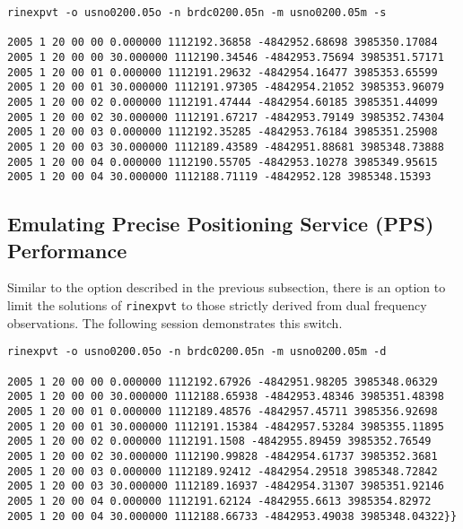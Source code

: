 \small
\begin{singlespace}
\begin{verbatim}
rinexpvt -o usno0200.05o -n brdc0200.05n -m usno0200.05m -s

2005 1 20 00 00 0.000000 1112192.36858 -4842952.68698 3985350.17084
2005 1 20 00 00 30.000000 1112190.34546 -4842953.75694 3985351.57171
2005 1 20 00 01 0.000000 1112191.29632 -4842954.16477 3985353.65599
2005 1 20 00 01 30.000000 1112191.97305 -4842954.21052 3985353.96079
2005 1 20 00 02 0.000000 1112191.47444 -4842954.60185 3985351.44099
2005 1 20 00 02 30.000000 1112191.67217 -4842953.79149 3985352.74304
2005 1 20 00 03 0.000000 1112192.35285 -4842953.76184 3985351.25908
2005 1 20 00 03 30.000000 1112189.43589 -4842951.88681 3985348.73888
2005 1 20 00 04 0.000000 1112190.55705 -4842953.10278 3985349.95615
2005 1 20 00 04 30.000000 1112188.71119 -4842952.128 3985348.15393
\end{verbatim}
\end{singlespace}
\normalsize


\subsection{Emulating Precise Positioning Service (PPS) Performance}

Similar to the option described in the previous subsection, there is an option
to limit the solutions of \texttt{rinexpvt} to those strictly derived from
dual frequency observations. The following session demonstrates this switch.

\small
\begin{singlespace}
\begin{verbatim}
rinexpvt -o usno0200.05o -n brdc0200.05n -m usno0200.05m -d

2005 1 20 00 00 0.000000 1112192.67926 -4842951.98205 3985348.06329
2005 1 20 00 00 30.000000 1112188.65938 -4842953.48346 3985351.48398
2005 1 20 00 01 0.000000 1112189.48576 -4842957.45711 3985356.92698
2005 1 20 00 01 30.000000 1112191.15384 -4842957.53284 3985355.11895
2005 1 20 00 02 0.000000 1112191.1508 -4842955.89459 3985352.76549
2005 1 20 00 02 30.000000 1112190.99828 -4842954.61737 3985352.3681
2005 1 20 00 03 0.000000 1112189.92412 -4842954.29518 3985348.72842
2005 1 20 00 03 30.000000 1112189.16937 -4842954.31307 3985351.92146
2005 1 20 00 04 0.000000 1112191.62124 -4842955.6613 3985354.82972
2005 1 20 00 04 30.000000 1112188.66733 -4842953.49038 3985348.04322}}
\end{verbatim}
\end{singlespace}
\normalsize



